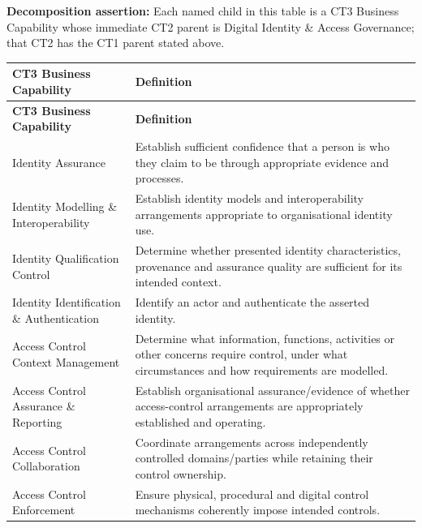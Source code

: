 \label{rad:business:772}

\textbf{Decomposition assertion:} Each named child in this table is a CT3 Business Capability whose immediate CT2 parent is Digital Identity \& Access Governance; that CT2 has the CT1 parent stated above.

\label{rad:business:774}
\begingroup\small\setlength{\TableWidth}{\dimexpr\linewidth-4\tabcolsep-3\arrayrulewidth\relax}
\begin{longtable}{|>{\raggedright\arraybackslash}p{0.35\TableWidth}|>{\raggedright\arraybackslash}p{0.65\TableWidth}|}
\hline\rowcolor{TableHead}\textbf{CT3 Business Capability} & \textbf{Definition}\\\hline\endfirsthead
\hline\rowcolor{TableHead}\textbf{CT3 Business Capability} & \textbf{Definition}\\\hline\endhead
\hline\endfoot
Identity Assurance & Establish sufficient confidence that a person is who they claim to be through appropriate evidence and processes.\\\hline
Identity Modelling \& Interoperability & Establish identity models and interoperability arrangements appropriate to organisational identity use.\\\hline
Identity Qualification Control & Determine whether presented identity characteristics, provenance and assurance quality are sufficient for its intended context.\\\hline
Identity Identification \& Authentication & Identify an actor and authenticate the asserted identity.\\\hline
Access Control Context Management & Determine what information, functions, activities or other concerns require control, under what circumstances and how requirements are modelled.\\\hline
Access Control Assurance \& Reporting & Establish organisational assurance/\allowbreak{}evidence of whether access-control arrangements are appropriately established and operating.\\\hline
Access Control Collaboration & Coordinate arrangements across independently controlled domains/\allowbreak{}parties while retaining their control ownership.\\\hline
Access Control Enforcement & Ensure physical, procedural and digital control mechanisms coherently impose intended controls.\\\hline
\end{longtable}\endgroup
{}\label{rad:business:785}

